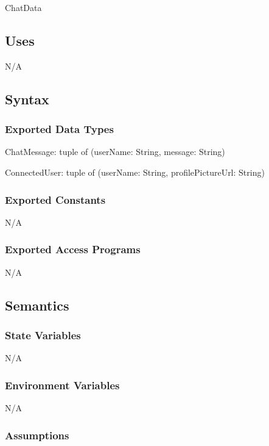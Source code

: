 \documentclass[12pt, titlepage]{article}
\begin{document}
	ChatData
	
	\subsection{Uses}
	
	N/A
	
	\subsection{Syntax}
	
	\subsubsection{Exported Data Types}
	
	ChatMessage: tuple of (userName: String, message: String)
	
	\noindent ConnectedUser: tuple of (userName: String, profilePictureUrl: String)
	
	\subsubsection{Exported Constants}
	
	N/A
	
	\subsubsection{Exported Access Programs}
	
	N/A
	
	\subsection{Semantics}
	
	\subsubsection{State Variables}
	
	N/A
	
	\subsubsection{Environment Variables}
	
	N/A
	
	\subsubsection{Assumptions}
	
\end{document}
